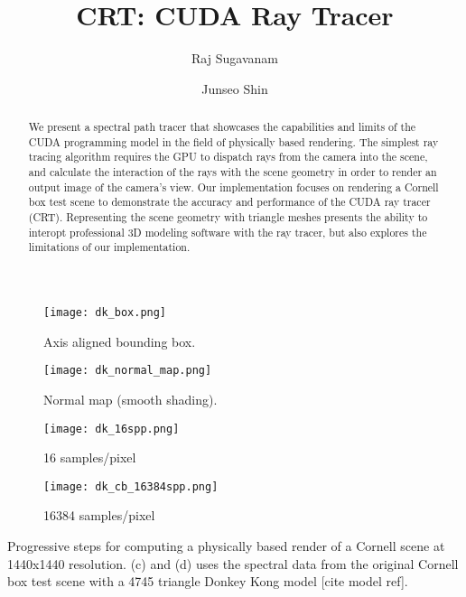 \documentclass[sigconf, screen]{acmart}
\begin{document}
\title{CRT: CUDA Ray Tracer}

\author{Raj Sugavanam}
\author{Junseo Shin}

\begin{abstract}
    We present a spectral path tracer that showcases the capabilities and limits of the CUDA
    programming model in the field of physically based rendering. The simplest ray tracing
    algorithm requires the GPU to dispatch rays from the camera into the scene, and
    calculate the interaction of the rays with the scene geometry in order to render an output
    image of the camera's view. Our implementation focuses on rendering a Cornell box test scene
    to demonstrate the accuracy and performance of the CUDA ray tracer (CRT). Representing the
    scene geometry with triangle meshes presents the ability to interopt professional 3D modeling
    software with the ray tracer, but also explores the limitations of our implementation.
\end{abstract}

\begin{teaserfigure}
    \centering
    \begin{subfigure}{0.24\textwidth}
        \centering
        \texttt{[image: dk\_box.png]}
        \caption{Axis aligned bounding box.}
        \label{fig:teaser1}
    \end{subfigure}
    \begin{subfigure}{0.24\textwidth}
        \centering
        \texttt{[image: dk\_normal\_map.png]}
        \caption{Normal map (smooth shading).}
        \label{fig:teaser2}
    \end{subfigure}
    \begin{subfigure}{0.24\textwidth}
        \centering
        \texttt{[image: dk\_16spp.png]}
        \caption{16 samples/pixel}
        \label{fig:teaser3}
    \end{subfigure}
    \begin{subfigure}{0.24\textwidth}
        \centering
        \texttt{[image: dk\_cb\_16384spp.png]}
        \caption{16384 samples/pixel}
        \label{fig:teaser4}
    \end{subfigure}
    \caption{
        Progressive steps for computing a physically based render of a Cornell
        scene at 1440x1440 resolution. (c) and (d) uses the spectral data from the original
        Cornell box test scene with a 4745 triangle Donkey Kong model [cite model ref].
    }
    \label{fig:teaser}
\end{teaserfigure}
\end{document}
